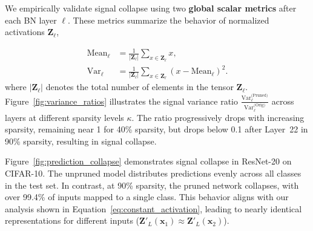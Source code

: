 We empirically validate signal collapse using two \textbf{global scalar metrics} after each BN layer \(\ell\). These metrics summarize the behavior of normalized activations \(\mathbf{Z}_\ell\),


\begin{align}
    \mathrm{Mean}_\ell &= \frac{1}{|\mathbf{Z}_\ell|} \sum_{x \in \mathbf{Z}_\ell} x, \\
    \mathrm{Var}_\ell &= \frac{1}{|\mathbf{Z}_\ell|} \sum_{x \in \mathbf{Z}_\ell} \left( x - \mathrm{Mean}_\ell \right)^2.
\end{align}
where \(|\mathbf{Z}_\ell|\) denotes the total number of elements in the tensor \(\mathbf{Z}_\ell\). Figure~\ref{fig:variance_ratios} illustrates the signal variance ratio \(\frac{\mathrm{Var}_\ell^{\text{(Pruned)}}}{\mathrm{Var}_\ell^{\text{(Orig)}}}\) across layers at different sparsity levels \(\kappa\). The ratio progressively drops with increasing sparsity, remaining near 1 for 40\% sparsity, but drops below 0.1 after Layer~22 in 90\% sparsity, resulting in signal collapse.%


Figure~\ref{fig:prediction_collapse} demonstrates signal collapse in ResNet-20 on CIFAR-10. The unpruned model distributes predictions evenly across all classes in the test set. In contrast, at 90\% sparsity, the pruned network collapses, with over 99.4\% of inputs mapped to a single class. This behavior aligns with our analysis shown in Equation~\ref{eq:constant_activation}, leading to nearly identical representations for different inputs ($\mathbf{Z}'_L(\mathbf{x}_1) \approx \mathbf{Z}'_L(\mathbf{x}_2)$).


